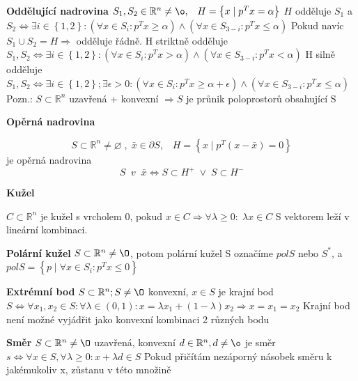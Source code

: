 \documentclass[a4]{report}
\theoremstyle{definition}
\begin{document}
\textbf{Oddělující nadrovina}
$S_{1},S_{2}\in \mathbb{R}^{n}\neq \o ,\; \; \; H=\left \{ x\; |\; p^{T}x=\alpha  \right \}$
\newline $H$ odděluje $S_{1}$ a $S_{2}\Leftrightarrow \exists i\in \left \{ 1,2 \right \}:(\forall x\in S_{i}:p^{T}x\geq \alpha )\wedge (\forall x\in S_{3-i}:p^{T}x\leq \alpha ) $  
\newline Pokud navíc $S_{1} \cup S_{2} = H\Rightarrow $ odděluje řádně.
\newline H striktně odděluje $S_{1}, S_{2}\Leftrightarrow \exists i\in \left \{ 1,2 \right \}:(\forall x\in S_{i}:p^{T}x>  \alpha )\wedge (\forall x\in S_{3-i}:p^{T}x<  \alpha )$
\newline H silně odděluje $S_{1}, S_{2}\Leftrightarrow \exists i\in \left \{ 1,2 \right \}; \exists \epsilon > 0 :(\forall x\in S_{i}:p^{T}x\geq   \alpha +\epsilon )\wedge (\forall x\in S_{3-i}:p^{T}x\leq   \alpha )$
Pozn.: $S\subset \mathbb{R}^{n} $ uzavřená + konvexní $ \Rightarrow S$ je průnik poloprostorů obsahující S



\textbf{Opěrná nadrovina}

$$ S\subset \mathbb{R}^{n}\neq \varnothing \; ,\; \bar{x} \in \partial S,\; \; \; H=\left \{ x\; |\; p^{T}(x-\bar{x})=0 \right \} $$ 
je opěrná nadrovina
$$ S\; \; v\; \; \bar{x} \Leftrightarrow S\subset H^{+}\; \vee \; S\subset H^{-}$$


\textbf{Kužel}

$C\subset \mathbb{R}^{n}$ je kužel s vrcholem 0, pokud $x \in C \Rightarrow \forall \lambda \geq 0: \; \lambda x \in C$ 
\newline S vektorem leží v lineární kombinaci.

\textbf{Polární kužel}
$ S\subset \mathbb{R}^{n}\neq \O $, potom polární kužel S označíme $polS$ nebo $S^{*}$, a $polS=\left \{  p\; |\; \forall x\in S_{i}:p^{T}x\leq  0 \right \}$




\textbf{Extrémní bod}
$ S\subset \mathbb{R}^{n}; S\neq \O $ konvexní, $x\in S$ je krajní bod $S\Leftrightarrow \forall x_{1},x_{2}\in S:\forall \lambda \in (0,1): x=\lambda x_{1}+(1-\lambda )x_{2}\Rightarrow x=x_{1}=x_{2}$
\newline Krajní bod není možné vyjádřit jako konvexní kombinaci 2 různých bodu 

\textbf{Směr}
$ S\subset \mathbb{R}^{n}\neq \O $ uzavřená, konvexní 
\newline $d\in \mathbb{R}^{n}, d\neq \o $ je směr $s\Leftrightarrow \forall x\in S, \forall \lambda \geq 0: x+\lambda d\in S$
\newline Pokud přičítám nezáporný násobek směru k jakémukoliv x, zůstanu v této množině
\end{document}
